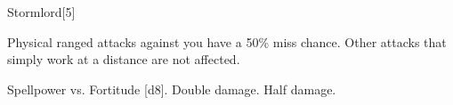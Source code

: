 \begin{spellsection}{Stormlord}[5]
    \begin{spellheader}
    \end{spellheader}
    \begin{spellcontent}
        \begin{spelltargetinginfo}
        \end{spelltargetinginfo}
        \begin{spelleffects}
            \spelleffect Physical ranged attacks against you have a 50\% miss chance. Other attacks that simply work at a distance are not affected.
            \spelldur \durshort
        \end{spelleffects}
    \end{spellcontent}
    \begin{spellsubcontent}
        \begin{spelltargetinginfo}
        \end{spelltargetinginfo}
        \begin{spelleffects}
            \begin{spellattack}{Spellpower vs. Fortitude}
                \spellsuccess {}[d8].
                \spellcritical Double damage.
                \spellfailure Half damage.
            \end{spellattack}
        \end{spelleffects}
    \end{spellsubcontent}
    \begin{spellfooter}
        \miscastexplode
    \end{spellfooter}
\end{spellsection}

